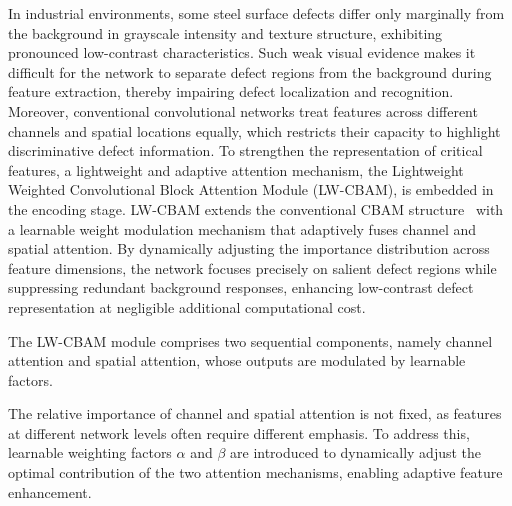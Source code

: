 \documentclass[sn-basic]{sn-jnl}
\theoremstyle{thmstyleone}%
\theoremstyle{thmstyletwo}%
\theoremstyle{thmstylethree}%
\begin{document}
In industrial environments, some steel surface defects differ only marginally from the background in grayscale intensity and texture structure, exhibiting pronounced low-contrast characteristics. Such weak visual evidence makes it difficult for the network to separate defect regions from the background during feature extraction, thereby impairing defect localization and recognition. Moreover, conventional convolutional networks treat features across different channels and spatial locations equally, which restricts their capacity to highlight discriminative defect information. To strengthen the representation of critical features, a lightweight and adaptive attention mechanism, the Lightweight Weighted Convolutional Block Attention Module (LW-CBAM), is embedded in the encoding stage. LW-CBAM extends the conventional CBAM structure~\cite{Woo2018CBAM} with a learnable weight modulation mechanism that adaptively fuses channel and spatial attention. By dynamically adjusting the importance distribution across feature dimensions, the network focuses precisely on salient defect regions while suppressing redundant background responses, enhancing low-contrast defect representation at negligible additional computational cost.

The LW-CBAM module comprises two sequential components, namely channel attention and spatial attention, whose outputs are modulated by learnable factors.




The relative importance of channel and spatial attention is not fixed, as features at different network levels often require different emphasis. To address this, learnable weighting factors $\alpha$ and $\beta$ are introduced to dynamically adjust the optimal contribution of the two attention mechanisms, enabling adaptive feature enhancement.  
\end{document}
